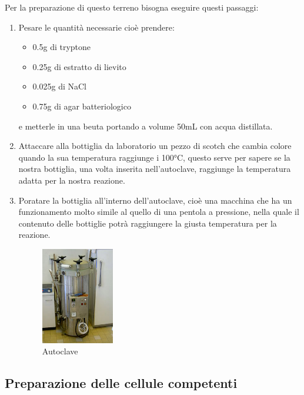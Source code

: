 Per la preparazione di questo terreno bisogna eseguire questi passaggi:

\begin{enumerate}

	\item Pesare le quantità necessarie cioè prendere:
  \begin{itemize}
    \item 0.5g di tryptone
    \item 0.25g di estratto di lievito
    \item 0.025g di NaCl
    \item 0.75g di agar batteriologico
  \end{itemize}
  e metterle in una beuta portando a volume 50mL con acqua distillata.
  \item Attaccare alla bottiglia da laboratorio un pezzo di scotch
  che cambia colore quando la sua temperatura
  raggiunge i 100°C, questo serve per sapere se la nostra bottiglia,
  una volta inserita nell'autoclave, raggiunge la
  temperatura adatta per la nostra reazione.

	\item Poratare la bottiglia all'interno dell'autoclave,
  cioè una macchina che ha un funzionamento molto simile al quello di una pentola a
  pressione, nella quale il contenuto delle bottiglie potrà raggiungere la
  giusta temperatura per la reazione.

  \begin{figure}[H]
		\centering
		\includegraphics[width=0.3\textwidth]{./immagini/autoclave.JPG}
		\caption{Autoclave}
		\label{autoclave}

	\end{figure}


\end{enumerate}

\subsection{Preparazione delle cellule competenti}

